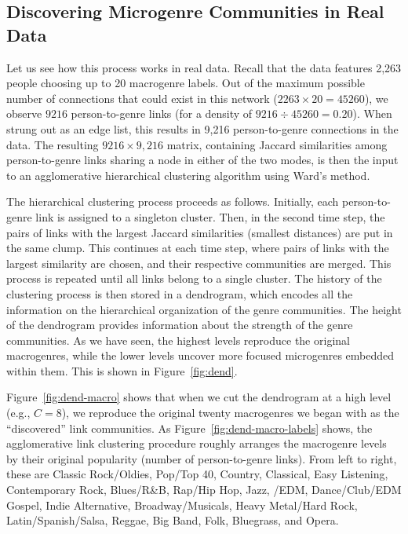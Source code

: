 \documentclass[a4paper,12pt]{article}
\begin{document}
\subsection{Discovering Microgenre Communities in Real Data}
Let us see how this process works in real data. Recall that the data features 2,263 people choosing up to 20 macrogenre labels. Out of the maximum possible number of connections that could exist in this network ($2263 \times 20 = 45260$), we observe $9216$ person-to-genre links (for a density of $9216 \div 45260 = 0.20$). When strung out as an edge list, this results in 9,216 person-to-genre connections in the data. The resulting $9216 \times 9,216$ matrix, containing Jaccard similarities among person-to-genre links sharing a node in either of the two modes, is then the input to an agglomerative hierarchical clustering algorithm using Ward's \citeyearpar{ward63} method. 

The hierarchical clustering process proceeds as follows. Initially, each person-to-genre link is assigned to a singleton cluster. Then, in the second time step, the pairs of links with the largest Jaccard similarities (smallest distances) are put in the same clump. This continues at each time step, where pairs of links with the largest similarity are chosen, and their respective communities are merged. This process is repeated until all links belong to a single cluster. The history of the clustering process is then stored in a dendrogram, which encodes all the information on the hierarchical organization of the genre communities. The height of the dendrogram provides information about the strength of the genre communities. As we have seen, the highest levels reproduce the original macrogenres, while the lower levels uncover more focused microgenres embedded within them. This is shown in Figure~\ref{fig:dend}. 

Figure~\ref{fig:dend-macro} shows that when we cut the dendrogram at a high level (e.g., $C = 8$), we reproduce the original twenty macrogenres we began with as the ``discovered'' link communities. As Figure~\ref{fig:dend-macro-labels} shows, the agglomerative link clustering procedure roughly arranges the macrogenre levels by their original popularity (number of person-to-genre links). From left to right, these are Classic Rock/Oldies, Pop/Top 40, Country, Classical, Easy Listening, Contemporary Rock, Blues/R\&B, Rap/Hip Hop, Jazz, /EDM, Dance/Club/EDM Gospel, Indie Alternative, Broadway/Musicals, Heavy Metal/Hard Rock, Latin/Spanish/Salsa, Reggae, Big Band, Folk, Bluegrass, and Opera. 
\end{document}
